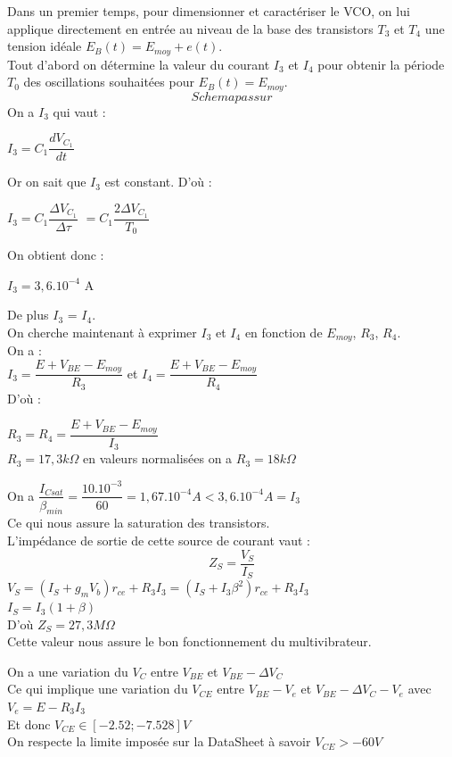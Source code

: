 \documentclass[a4paper]{report}
\begin{document}
Dans un premier temps, pour dimensionner et caractériser le VCO, on lui applique directement en entrée au niveau de la base des transistors $T_3$ et $T_4$ une tension idéale $E_B(t) = E_{moy} + e(t)$.\\
Tout d'abord on détermine la valeur du courant $I_3$ et $I_4$ pour obtenir la période $T_0$ des oscillations souhaitées pour $E_B(t) = E_{moy}$.\\
$$Schemapassur$$
On a $I_3$ qui vaut : \\
\begin{center}
$I_3 = C_1 \dfrac{dV_{C_1}}{dt} $\\
\end{center}
Or on sait que $I_3$ est constant. 
D'où :
\begin{center}
 $I_3 = C_1 \dfrac{\Delta V_{C_1}}{\Delta \tau} $
$ = C_1 \dfrac{2\Delta V_{C_1}}{T_0} $
\end{center}
On obtient donc : \\
\begin{center}
$I_3 = 3,6.10^{-4} $ A
\end{center}
De plus $I_3$ = $I_4$.\\

On cherche maintenant à exprimer $I_3$ et $I_4$ en fonction de $E_{moy}$, $R_3$, $R_4$.\\
On a :\\
$I_3 = \dfrac{E + V_{BE} - E_{moy}}{R_3}$ et $I_4 = \dfrac{E + V_{BE} - E_{moy}}{R_4}$\\
D'où :\\
\begin{center}
 $R_3 = R_4 =  \dfrac{E + V_{BE} - E_{moy}}{I_3} $\\
 $R_3 = 17,3 k\Omega$ en valeurs normalisées on a $R_3 = 18 k\Omega$
\end{center}
On a $\dfrac{I_{Csat}}{\beta _{min}} = \dfrac{10.10^{-3}}{60}= 1,67.10^{-4} A < 3,6.10^{-4} A = I_3$\\
Ce qui nous assure la saturation des transistors.\\
L'impédance de sortie de cette source de courant vaut : \\
$$ Z_S = \dfrac{V_S}{I_S} $$
$V_S = (I_S + g_mV_b) r_{ce} + R_3I_3 = (I_S + I_3  \beta^2) r_{ce} + R_3I_3 $\\
$I_S = I_3(1+\beta)$\\
D'où $Z_S = 27,3 M\Omega$\\
Cette valeur nous assure le bon fonctionnement du multivibrateur.

On a une variation du $V_{C}$ entre $V_{BE}$
et $V_{BE}-\Delta V_C$\\
Ce qui implique une variation du $V_{CE}$ entre $V_{BE}-V_e$ et $V_{BE}-\Delta V_C-V_e$
avec $V_e=E-R_3I_3$\\
Et donc $V_{CE} \in [ -2.52 ; -7.528 ] V $ \\
On respecte la limite imposée sur la DataSheet à savoir $V_{CE}>-60V$ \\
\end{document}
